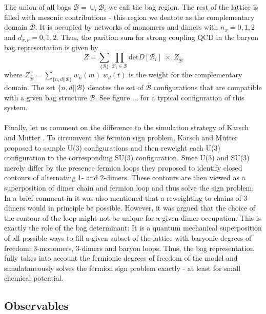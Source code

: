 \documentclass{PoS}
\begin{document}
The union of all bags $\mathcal{B} = \cup_i \mathcal{B}_i$ we call the bag region. The rest of the lattice is filled with mesonic contributions - this region we dentote as the complementary domain $\overline{\mathcal{B}}$. It is occupied by networks of  monomers and dimers with $n_x = 0,1,2$ and $d_{x,\nu} = 0,1,2$. Thus, the parition sum for strong coupling QCD in the baryon bag representation is given by
\begin{equation}
Z = \sum_{\{\mathcal{B}\}}\prod_{\mathcal{B}_i \in \mathcal{B}} \text{det}D[\mathcal{B}_i] \; \times \; Z_{\overline{\mathcal{B}}}
\end{equation}
where $Z_{\overline{\mathcal{B}}} = \sum_{\{n, d || \mathcal{B}\}} w_n(m) \; w_d(t)$ is the weight for the complementary domain. The set $\{n, d || \mathcal{B}\}$ denotes the set of $\overline{\mathcal{B}}$ configurations that are compatible with a given bag structure $\mathcal{B}$. See figure ... for a typical configuration of this system.\\
\\
Finally, let us comment on the difference to the simulation strategy of Karsch and M\"utter \cite{Karsch:1988zx}. To circumvent the fermion sign problem, Karsch and M\"utter proposed to sample U(3) configurations and then reweight each U(3) configuration to the corresponding SU(3) configuration. Since U(3) and SU(3) merely differ by the presence fermion loops they proposed to identify closed contours of alternating 1- and 2-dimers. These contours are then viewed as a superposition of dimer chain and fermion loop and thus solve the sign problem. In a brief comment in \cite{Karsch:1988zx} it was also mentioned that a reweighting to chains of 3-dimers would in principle be possible. However, it was argued that the choice of the contour of the loop might not be unique for a given dimer occupation. This is exactly the role of the bag determinant: It is a quantum mechanical superposition of all possible ways to fill a given subset of the lattice with baryonic degrees of freedom: 3-monomers, 3-dimers and baryon loops. Thus, the bag representation fully takes into account the fermionic degrees of freedom of the model and simulataneously solves the fermion sign problem exactly - at least for small chemical potential.

\subsection{Observables}
\end{document}
